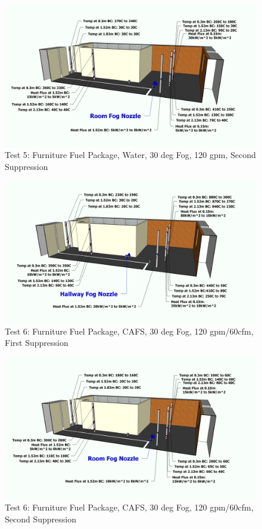 \documentclass[12pt,oneside]{book}
\begin{document}
\begin{figure}[!ht]
	\includegraphics[width=6in]{../Figures/Pictures/Metric/DelCoFogTest5SecondSuppression}
	\caption{Test 5: Furniture Fuel Package, Water, 30 deg Fog, 120 gpm, Second Suppression}
	\label{fig:Test_5_Second_Suppression}
\end{figure}

\begin{figure}[!ht]
	\includegraphics[width=6in]{../Figures/Pictures/Metric/DelCoFogTest6FirstSuppression}
	\caption{Test 6: Furniture Fuel Package, CAFS, 30 deg Fog, 120 gpm/60cfm, First Suppression}
	\label{fig:Test_6_First_Suppression}
\end{figure}

\begin{figure}[!ht]
	\includegraphics[width=6in]{../Figures/Pictures/Metric/DelCoFogTest6SecondSuppression}
	\caption{Test 6: Furniture Fuel Package, CAFS, 30 deg Fog, 120 gpm/60cfm, Second Suppression}
	\label{fig:Test_6_Second_Suppression}
\end{figure}
\end{document}
